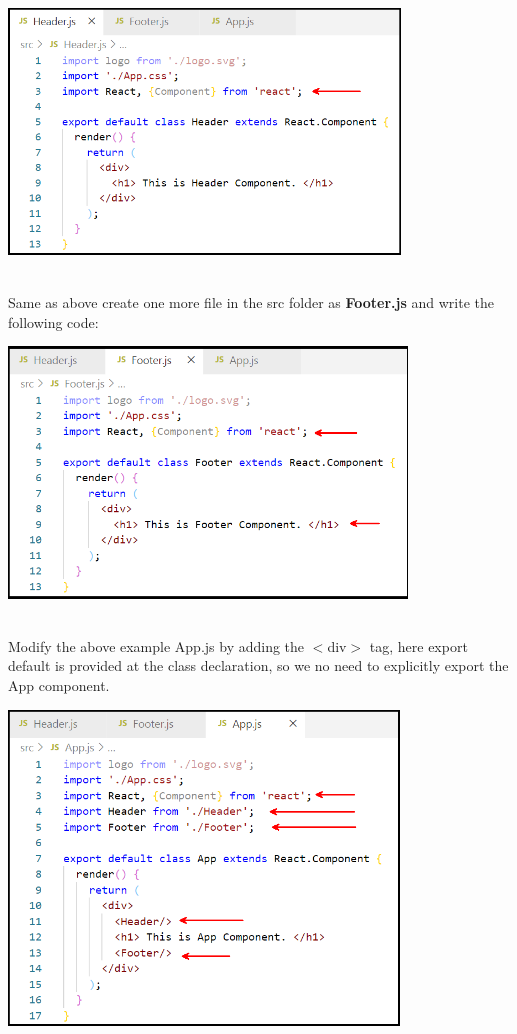 \documentclass{article}
\begin{document}
\begin{center}
	\noindent \includegraphics*[width=4.10in, height=2.57in]{IMG-07-20}
\end{center}

\noindent 
\newpage
\noindent\\
 Same as above create one more file in the src folder as \textbf{Footer.js} and write the following code:

\begin{center}
	\noindent \includegraphics*[width=4.17in, height=2.63in]{IMG-07-21}
\end{center}

\noindent 

\noindent\\
 Modify the above example App.js by adding the $\mathrm{<}$div$\mathrm{>}$ tag, here export default is provided at the class declaration, so we no need to explicitly export the App component.

\begin{center}
	\noindent \includegraphics*[width=4.08in, height=3.30in]{IMG-07-22}
\end{center}
\end{document}
